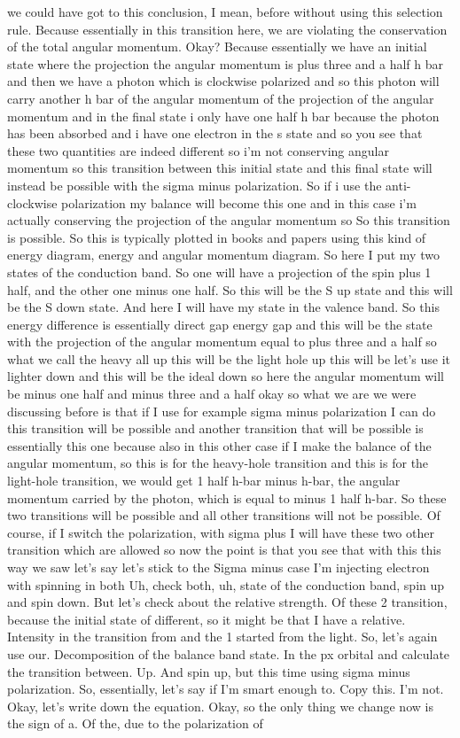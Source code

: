 we could have got to this conclusion, I mean, before without using this selection rule. Because essentially in this transition here, we are violating the conservation of the total angular momentum. Okay? Because essentially we have an initial state where the projection the angular momentum is plus three and a half h bar and then we have a photon which is clockwise polarized and so this photon will carry another h bar of the angular momentum of the projection of the angular momentum and in the final state i only have one half h bar because the photon has been absorbed and i have one electron in the s state and so you see that these two quantities are indeed different so i'm not conserving angular momentum so this transition between this initial state and this final state will instead be possible with the sigma minus polarization.
So if i use the anti-clockwise polarization my balance will become this one and in this case i'm actually conserving the projection of the angular momentum so So this transition is possible. So this is typically plotted in books and papers using this kind of energy diagram, energy and angular momentum diagram. So here I put my two states of the conduction band. So one will have a projection of the spin plus 1 half, and the other one minus one half. So this will be the S up state and this will be the S down state. And here I will have my state in the valence band. So this energy difference is essentially direct gap energy gap and this will be the state with the projection of the angular momentum equal to plus three and a half so what we call the heavy all up this will be the light hole up this will be let's use it lighter down and this will be the ideal down so here the angular momentum will be minus one half and minus three and a half okay so what we are we were discussing before is that if I use for example sigma minus polarization I can do this transition will be possible and another transition that will be possible is essentially this one because also in this other case if I make the balance of the angular momentum, so this is for the heavy-hole transition and this is for the light-hole transition, we would get 1 half h-bar minus h-bar, the angular momentum carried by the photon, which is equal to minus 1 half h-bar. So these two transitions will be possible and all other transitions will not be possible. Of course, if I switch the polarization, with sigma plus I will have these two other transition which are allowed so now the point is that you see that with this this way we saw let's say let's stick to the Sigma minus case I'm injecting electron with spinning in both Uh, check both, uh, state of the conduction band, spin up and spin down. But let's check about the relative strength. Of these 2 transition, because the initial state of different, so it might be that I have a relative. Intensity in the transition from and the 1 started from the light. So, let's again use our. Decomposition of the balance band state. In the px orbital and calculate the transition between. Up. And spin up, but this time using sigma minus polarization. So, essentially, let's say if I'm smart enough to. Copy this. I'm not. Okay, let's write down the equation. Okay, so the only thing we change now is the sign of a. Of the, due to the polarization of 